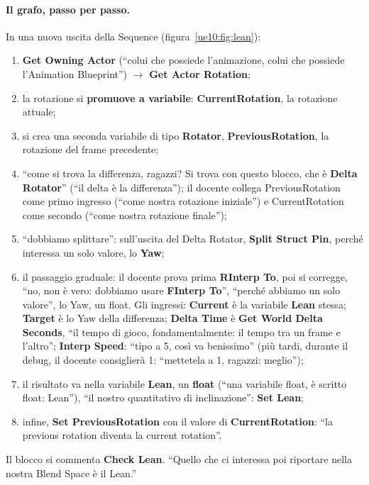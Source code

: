 \paragraph{Il grafo, passo per passo.} In una nuova uscita della Sequence
(figura~\ref{ue10:fig:lean}):
\begin{enumerate}
  \item \textbf{Get Owning Actor} (``colui che possiede l'animazione, colui che possiede
        l'Animation Blueprint'') $\rightarrow$ \textbf{Get Actor Rotation};
  \item la rotazione si \textbf{promuove a variabile}: \textbf{CurrentRotation}, la
        rotazione attuale;
  \item si crea una seconda variabile di tipo \textbf{Rotator}, \textbf{PreviousRotation},
        la rotazione del frame precedente;
  \item ``come si trova la differenza, ragazzi? Si trova con questo blocco, che è
        \textbf{Delta Rotator}'' (``il delta è la differenza''); il docente collega
        PreviousRotation come primo ingresso (``come nostra rotazione iniziale'') e
        CurrentRotation come secondo (``come nostra rotazione finale'');
  \item ``dobbiamo splittare'': sull'uscita del Delta Rotator, \textbf{Split Struct Pin},
        perché interessa un solo valore, lo \textbf{Yaw};
  \item il passaggio graduale: il docente prova prima \textbf{RInterp To}, poi si
        corregge, ``no, non è vero: dobbiamo usare \textbf{FInterp To}'', ``perché abbiamo
        un solo valore'', lo Yaw, un float. Gli ingressi: \textbf{Current} è la variabile
        \textbf{Lean} stessa; \textbf{Target} è lo Yaw della differenza; \textbf{Delta
        Time} è \textbf{Get World Delta Seconds}, ``il tempo di gioco, fondamentalmente: il
        tempo tra un frame e l'altro''; \textbf{Interp Speed}: ``tipo a 5, così va
        benissimo'' (più tardi, durante il debug, il docente consiglierà 1:
        ``mettetela a 1, ragazzi: meglio'');
  \item il risultato va nella variabile \textbf{Lean}, un \textbf{float} (``una
        variabile float, è scritto float: Lean''), ``il nostro quantitativo di
        inclinazione'': \textbf{Set Lean};
  \item infine, \textbf{Set PreviousRotation} con il valore di \textbf{CurrentRotation}:
        ``la previous rotation diventa la current rotation''.
\end{enumerate}
Il blocco si commenta \textbf{Check Lean}. ``Quello che ci interessa poi riportare nella
nostra Blend Space è il Lean.''

